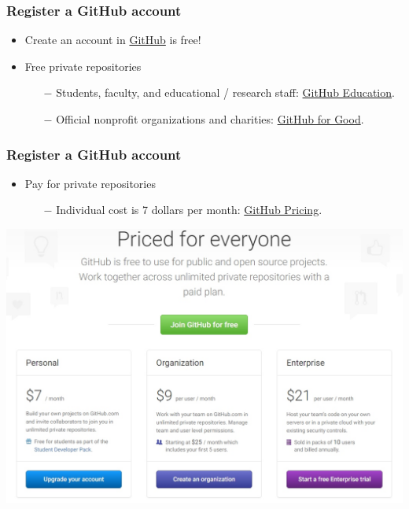 \documentclass[svgnames]{beamer}
\begin{document}
\begin{frame}
\frametitle{Register a GitHub account}
  \begin{itemize}
    \item Create an account in \href{https://github.com/}{\faStar GitHub} is free! \hfill \break
    \item Free private repositories
        \begin{itemize}
        \item[$-$] Students, faculty, and educational / research staff: \href{https://education.github.com/}{\faStar GitHub Education}.
        \item[$-$] Official nonprofit organizations and charities: \href{https://github.com/nonprofit}{\faStar GitHub for Good}.
       \end{itemize}
        
\end{itemize}
\end{frame}

\begin{frame}
\frametitle{Register a GitHub account}
\begin{itemize}
    \item Pay for private repositories
    \begin{itemize}
    \item[$-$] Individual cost is 7 dollars per month: \href{https://github.com/pricing}{\faStar GitHub Pricing}.
    \end{itemize}

\end{itemize}

\begin{center}
\includegraphics[scale=0.35]{img/github_pricing.jpg}
\end{center}  
\end{frame}
\end{document}
